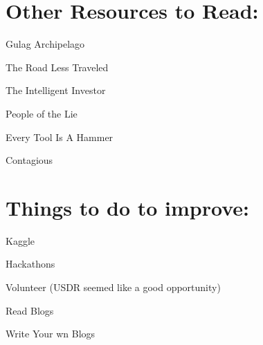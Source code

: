 \documentclass[12pt]{article}
\begin{document}
\section*{Other Resources to Read:}
\begin{description}
    \item Gulag Archipelago
    \item The Road Less Traveled
    \item The Intelligent Investor
    \item People of the Lie
    \item Every Tool Is A Hammer
    \item Contagious
\end{description}


\section*{Things to do to improve:}
\begin{description}
    \item Kaggle
    \item Hackathons
    \item Volunteer (USDR seemed like a good opportunity)
    \item Read Blogs
    \item Write Your wn Blogs
\end{description}
\end{document}
